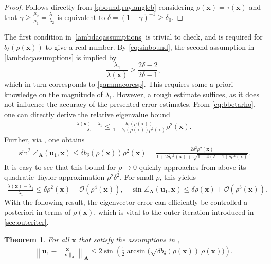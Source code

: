 \documentclass[a4paper,11pt,oneside]{amsart}
\newtheorem{theorem}{Theorem}
\theoremstyle{definition}
\theoremstyle{remark}
\newcommand{\A}{\ten A}
\newcommand{\ten}[1]{\boldsymbol{#1}}
\newcommand{\bfun}{b}
\numberwithin{equation}{section}
\numberwithin{theorem}{section}
\begin{document}
\begin{proof}
 Follows directly from \cref{qbound,raylangleb} considering $\rho(\ten x) = \tau(\ten x)$ and that $\gamma \geq \frac{\mu_2}{\mu_1} = \frac{\lambda_1}{\lambda_2}$ is equivalent to $\delta = (1 - \gamma)^{-1} \geq \delta_0$. 
%
%
%
\end{proof}
The first condition in \eqref{lambdaqassumptions} is trivial to check, and is required for $\bfun_\delta(\rho(\ten x))$ to give a real number. 
%
%
By \cref{eq:sinbound}, the second assumption in \cref{lambdaqassumptions} is implied by
\begin{equation}\label{eq:imply2ndeq}
 \frac{\lambda_1}{\lambda(\ten x)} \geq \frac{2\delta - 2}{2\delta - 1},
\end{equation}
which in turn corresponds to \cref{gammacoresp}.
This requires some a priori knowledge on the magnitude of $\lambda_1$. However, a rough estimate suffices, as it does not influence the accuracy of the presented error estimates.
From \cref{eq:bbetarho}, one can directly derive the relative eigenvalue bound
\begin{align}\label{eq:releigerr}
 \frac{\lambda(\ten x) - \lambda_1}{\lambda_1} \leq \frac{\bfun_\delta(\rho(\ten x))}{1-\bfun_\delta(\rho(\ten x)) \rho^2(\ten x)} \rho^2(\ten x).
\end{align}
Further, via , one obtains
\begin{align}\label{eq:nicesin2bound}
 \sin^2\angle_{\A}(\ten u_1,\ten x) \leq \delta \bfun_\delta( \rho(\ten x)) \rho^2(\ten x) =
%
\frac{2 \delta^2 \rho^2(\ten x)}{1 + 2 \delta \rho^2(\ten x) + \sqrt{1 - 4 (\delta - 1) \delta \rho^2(\ten x)}}.
\end{align}
It is easy to see that this bound for $\rho \rightarrow 0$ quickly approaches from above its quadratic Taylor approximation $\rho^2 \delta^2$. For small $\rho$, this  yields
\begin{align}\label{eq:sinlinappr}
\frac{\lambda(\ten x) - \lambda_1}{\lambda_1}  \leq \delta \rho^2(\ten x) + \mathcal{O}(\rho^4(\ten x)), \quad
 \sin \angle_{\A}(\ten u_1,\ten x) \leq \delta \rho(\ten x)  + \mathcal{O}(\rho^3(\ten x)). 
\end{align}
With the following result, the eigenvector error can efficiently be controlled a posteriori in terms of $\rho(\ten x)$, which is vital to the outer iteration introduced in \cref{sec:outeriter}. 

\begin{theorem}\label{aposterbound}
 For all $\ten x$ that satisfy the assumptions in ,
%
%
 \begin{align}\label{eq:everrbound}
 \left\| \ten{u}_1 - \frac{\ten x}{\|\ten x\|_{\A}} \right\|_{\A} \leq 2 \sin \left(\frac{1}{2} \arcsin \bigl( \sqrt{ \delta  \bfun_\delta( \rho(\ten x)) } \, \rho(\ten x) \bigr) \right).
%
 \end{align}
%
\end{theorem}
%
\end{document}
